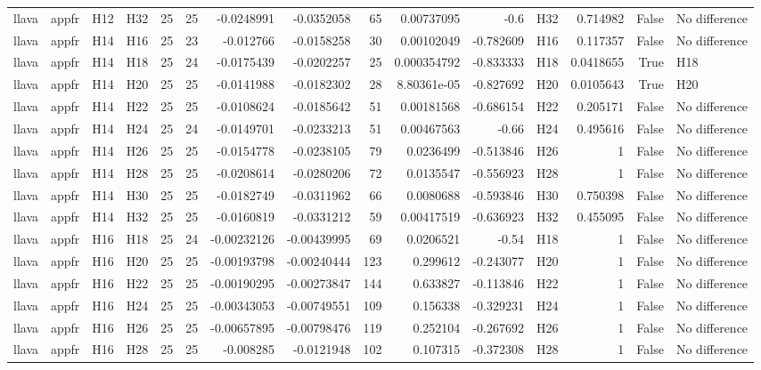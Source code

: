 \begin{longtable}{llllrrrrrrrlrrl}
llava & appfr & H12 & H32 & 25 & 25 & -0.0248991 & -0.0352058 & 65 & 0.00737095 & -0.6 & H32 & 0.714982 & False & No difference \\
llava & appfr & H14 & H16 & 25 & 23 & -0.012766 & -0.0158258 & 30 & 0.00102049 & -0.782609 & H16 & 0.117357 & False & No difference \\
llava & appfr & H14 & H18 & 25 & 24 & -0.0175439 & -0.0202257 & 25 & 0.000354792 & -0.833333 & H18 & 0.0418655 & True & H18 \\
llava & appfr & H14 & H20 & 25 & 25 & -0.0141988 & -0.0182302 & 28 & 8.80361e-05 & -0.827692 & H20 & 0.0105643 & True & H20 \\
llava & appfr & H14 & H22 & 25 & 25 & -0.0108624 & -0.0185642 & 51 & 0.00181568 & -0.686154 & H22 & 0.205171 & False & No difference \\
llava & appfr & H14 & H24 & 25 & 24 & -0.0149701 & -0.0233213 & 51 & 0.00467563 & -0.66 & H24 & 0.495616 & False & No difference \\
llava & appfr & H14 & H26 & 25 & 25 & -0.0154778 & -0.0238105 & 79 & 0.0236499 & -0.513846 & H26 & 1 & False & No difference \\
llava & appfr & H14 & H28 & 25 & 25 & -0.0208614 & -0.0280206 & 72 & 0.0135547 & -0.556923 & H28 & 1 & False & No difference \\
llava & appfr & H14 & H30 & 25 & 25 & -0.0182749 & -0.0311962 & 66 & 0.0080688 & -0.593846 & H30 & 0.750398 & False & No difference \\
llava & appfr & H14 & H32 & 25 & 25 & -0.0160819 & -0.0331212 & 59 & 0.00417519 & -0.636923 & H32 & 0.455095 & False & No difference \\
llava & appfr & H16 & H18 & 25 & 24 & -0.00232126 & -0.00439995 & 69 & 0.0206521 & -0.54 & H18 & 1 & False & No difference \\
llava & appfr & H16 & H20 & 25 & 25 & -0.00193798 & -0.00240444 & 123 & 0.299612 & -0.243077 & H20 & 1 & False & No difference \\
llava & appfr & H16 & H22 & 25 & 25 & -0.00190295 & -0.00273847 & 144 & 0.633827 & -0.113846 & H22 & 1 & False & No difference \\
llava & appfr & H16 & H24 & 25 & 25 & -0.00343053 & -0.00749551 & 109 & 0.156338 & -0.329231 & H24 & 1 & False & No difference \\
llava & appfr & H16 & H26 & 25 & 25 & -0.00657895 & -0.00798476 & 119 & 0.252104 & -0.267692 & H26 & 1 & False & No difference \\
llava & appfr & H16 & H28 & 25 & 25 & -0.008285 & -0.0121948 & 102 & 0.107315 & -0.372308 & H28 & 1 & False & No difference \\

\end{longtable}

